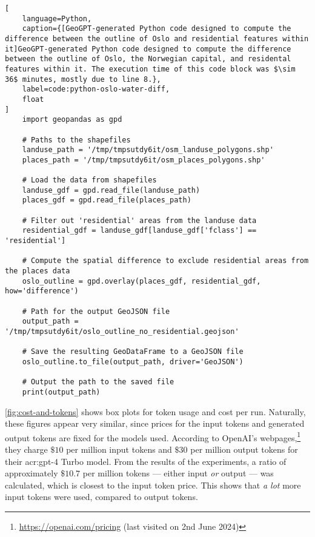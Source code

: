 \FloatBarrier

\begin{lstlisting}[
    language=Python,
    caption={[GeoGPT-generated Python code designed to compute the difference between the outline of Oslo and residential features within it]GeoGPT-generated Python code designed to compute the difference between the outline of Oslo, the Norwegian capital, and residental features within it. The execution time of this code block was $\sim 36$ minutes, mostly due to line 8.},
    label=code:python-oslo-water-diff,
    float
]
    import geopandas as gpd

    # Paths to the shapefiles
    landuse_path = '/tmp/tmpsutdy6it/osm_landuse_polygons.shp'
    places_path = '/tmp/tmpsutdy6it/osm_places_polygons.shp'
    
    # Load the data from shapefiles
    landuse_gdf = gpd.read_file(landuse_path)
    places_gdf = gpd.read_file(places_path)
    
    # Filter out 'residential' areas from the landuse data
    residential_gdf = landuse_gdf[landuse_gdf['fclass'] == 'residential']
     
    # Compute the spatial difference to exclude residential areas from the places data
    oslo_outline = gpd.overlay(places_gdf, residential_gdf, how='difference')
    
    # Path for the output GeoJSON file
    output_path = '/tmp/tmpsutdy6it/oslo_outline_no_residential.geojson'
    
    # Save the resulting GeoDataFrame to a GeoJSON file
    oslo_outline.to_file(output_path, driver='GeoJSON')
    
    # Output the path to the saved file
    print(output_path)    
\end{lstlisting}

\FloatBarrier

\autoref{fig:cost-and-tokens} shows box plots for token usage and cost per run. Naturally, these figures appear very similar, since prices for the input tokens and generated output tokens are fixed for the models used. According to OpenAI's webpages,\footnote{\url{https://openai.com/pricing} (last visited on 2nd June 2024)} they charge $\$10$ per million input tokens and $\$30$ per million output tokens for their \acrshort{acr:gpt}-4 Turbo model. From the results of the experiments, a ratio of approximately $\text{\$}10.7$ per million tokens --- either input \textit{or} output --- was calculated, which is closest to the input token price. This shows that \textit{a lot} more input tokens were used, compared to output tokens.

